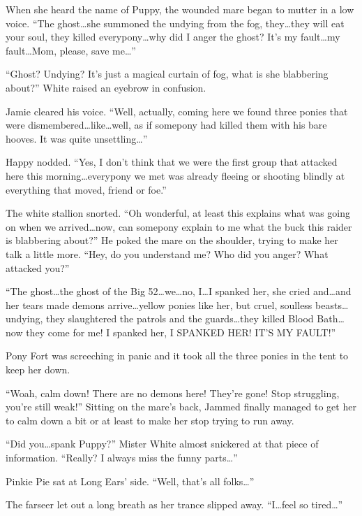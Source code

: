 When she heard the name of Puppy, the wounded mare began to mutter in a low voice. ``The ghost\dots she summoned the undying from the fog, they\dots they will eat your soul, they killed everypony\dots why did I anger the ghost? It's my fault\dots my fault\dots Mom, please, save me\dots''

``Ghost? Undying? It's just a magical curtain of fog, what is she blabbering about?'' White raised an eyebrow in confusion.

Jamie cleared his voice. ``Well, actually, coming here we found three ponies that were dismembered\dots like\dots well, as if somepony had killed them with his bare hooves. It was quite unsettling\dots''

Happy nodded. ``Yes, I don't think that we were the first group that attacked here this morning\dots everypony we met was already fleeing or shooting blindly at everything that moved, friend or foe.''

The white stallion snorted. ``Oh wonderful, at least this explains what was going on when we arrived\dots now, can somepony explain to me what the buck this raider is blabbering about?'' He poked the mare on the shoulder, trying to make her talk a little more. ``Hey, do you understand me? Who did you anger? What attacked you?''

``The ghost\dots the ghost of the Big 52\dots we\dots no, I\dots I spanked her, she cried and\dots and her tears made demons arrive\dots yellow ponies like her, but cruel, soulless beasts\dots undying, they slaughtered the patrols and the guards\dots they killed Blood Bath\dots now they come for me! I spanked her, I SPANKED HER! IT'S MY FAULT!''

Pony Fort was screeching in panic and it took all the three ponies in the tent to keep her down.

``Woah, calm down! There are no demons here! They're gone! Stop struggling, you're still weak!'' Sitting on the mare's back, Jammed finally managed to get her to calm down a bit or at least to make her stop trying to run away.

``Did you\dots spank Puppy?'' Mister White almost snickered at that piece of information. ``Really? I always miss the funny parts\dots''

\horizonline


Pinkie Pie sat at Long Ears' side. ``Well, that's all folks\dots''

The farseer let out a long breath as her trance slipped away. ``I\dots feel so tired\dots''

